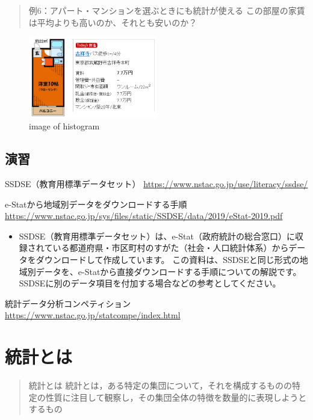 \documentclass[
]{book}
\providecommand{\tightlist}{%
  \setlength{\itemsep}{0pt}\setlength{\parskip}{0pt}}
\theoremstyle{definition}
\theoremstyle{definition}
\theoremstyle{definition}
\theoremstyle{definition}
\theoremstyle{remark}
\begin{document}
\begin{quote}
例6：アパート・マンションを選ぶときにも統計が使える
この部屋の家賃は平均よりも高いのか、それとも安いのか？
\end{quote}

\begin{figure}
\centering
\includegraphics[width=0.5\textwidth,height=\textheight]{images/lec01/fig_kichi_1room_example.png}
\caption{image of histogram}
\end{figure}

\hypertarget{ux6f14ux7fd2}{%
\subsection{演習}\label{ux6f14ux7fd2}}

SSDSE（教育用標準データセット）
\url{https://www.nstac.go.jp/use/literacy/ssdse/}

e-Statから地域別データをダウンロードする手順
\url{https://www.nstac.go.jp/sys/files/static/SSDSE/data/2019/eStat-2019.pdf}

\begin{itemize}
\tightlist
\item
  SSDSE（教育用標準データセット）は、e-Stat（政府統計の総合窓口）に収録されている都道府県・市区町村のすがた（社会・人口統計体系）からデータをダウンロードして作成しています。
  この資料は、SSDSEと同じ形式の地域別データを、e-Statから直接ダウンロードする手順についての解説です。SSDSEに別のデータ項目を付加する場合などの参考としてください。
\end{itemize}

統計データ分析コンペティション
\url{https://www.nstac.go.jp/statcompe/index.html}

\hypertarget{ux7d71ux8a08ux3068ux306f}{%
\section{統計とは}\label{ux7d71ux8a08ux3068ux306f}}

\begin{quote}
統計とは
統計とは，ある特定の集団について，それを構成するものの特定の性質に注目して観察し，その集団全体の特徴を数量的に表現しようとするもの
\end{quote}
\end{document}
